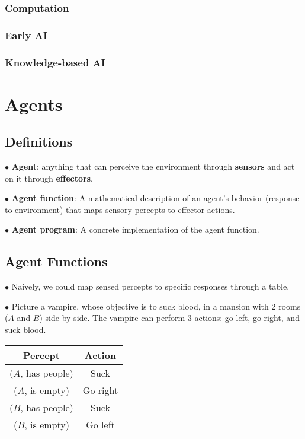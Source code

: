 \documentclass[english,openany]{book}
\begin{document}
    \subsection{Computation}
    
    \subsection{Early AI}
    
    \subsection{Knowledge-based AI}
    
    \chapter{Agents}
    
    \section{Definitions}
    
    $\bullet$ \textbf{Agent}: anything that can perceive the environment through \textbf{sensors} and act on it through \textbf{effectors}.
    
    $\bullet$ \textbf{Agent function}: A mathematical description of an agent's behavior (response to environment) that maps sensory percepts to effector actions.
    
    $\bullet$ \textbf{Agent program}: A concrete implementation of the agent function.
    
    \section{Agent Functions}
    
    $\bullet$ Naively, we could map sensed percepts to specific responses through a table.
    
    $\bullet$ Picture a vampire, whose objective is to suck blood, in a mansion with 2 rooms ($A$ and $B$) side-by-side. The vampire can perform 3 actions: go left, go right, and suck blood.
    
    \begin{tabular}{|c|c|}
        \hline
        Percept & Action\\
        \hline
        ($A$, has people) & Suck\\
        ($A$, is empty) & Go right\\
        ($B$, has people) & Suck\\
        ($B$, is empty) & Go left\\
        \hline
    \end{tabular}
    
\end{document}
